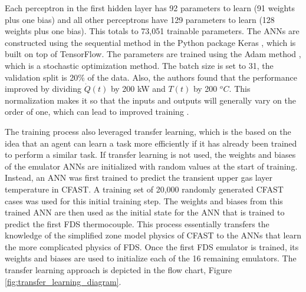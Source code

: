 \documentclass{article}
\begin{document}
Each perceptron in the first hidden layer has 92 parameters to learn (91 weights plus one bias) and all other perceptrons have 129 parameters to learn (128 weights plus one bias). This totals to 73,051 trainable parameters. The ANNs are constructed using the sequential method in the Python package Keras \cite{chollet2018keras}, which is built on top of TensorFlow. The parameters are trained using the Adam method \cite{kingma2014adam}, which is a stochastic optimization method. The batch size is set to 31, the validation split is  20\% of the data. Also, the authors found that the performance improved by dividing $\dot{Q}(t)$ by 200 kW and $T(t)$ by 200 $^oC$. This normalization makes it so that the inputs and outputs will generally vary on the order of one, which can lead to improved training \cite{sola1997importance}. 

The training process also leveraged transfer learning, which is the based on the idea that an agent can learn a task more efficiently if it has already been trained to perform a similar task. If transfer learning is not used, the weights and biases of the emulator ANNs are initialized with random values at the start of training. Instead, an ANN was first trained to predict the transient upper gas layer temperature in CFAST. A training set of 20,000 randomly generated CFAST cases was used for this initial training step. The weights and biases from this trained ANN are then used as the initial state for the ANN that is trained to predict the first FDS thermocouple. This process essentially transfers the knowledge of the simplified zone model physics of CFAST to the ANNs that learn the more complicated physics of FDS. Once the first FDS emulator is trained, its weights and biases are used to initialize each of the 16 remaining emulators. The transfer learning approach is depicted in the flow chart, Figure \ref{fig:transfer_learning_diagram}.
\end{document}
